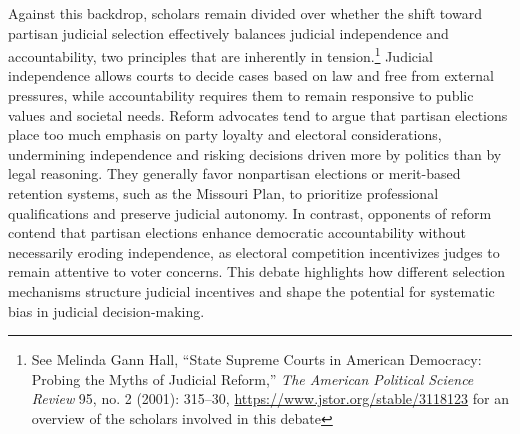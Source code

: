 Against this backdrop, scholars remain divided over whether the shift
toward partisan judicial selection effectively balances judicial
independence and accountability, two principles that are inherently in
tension.\footnote{See Melinda Gann Hall, {``State {Supreme Courts} in
  {American Democracy}: {Probing} the {Myths} of {Judicial Reform},''}
  \emph{The American Political Science Review} 95, no. 2 (2001):
  315--30, \url{https://www.jstor.org/stable/3118123} for an overview of
  the scholars involved in this debate} Judicial independence allows
courts to decide cases based on law and free from external pressures,
while accountability requires them to remain responsive to public values
and societal needs. Reform advocates tend to argue that partisan
elections place too much emphasis on party loyalty and electoral
considerations, undermining independence and risking decisions driven
more by politics than by legal reasoning. They generally favor
nonpartisan elections or merit-based retention systems, such as the
Missouri Plan, to prioritize professional qualifications and preserve
judicial autonomy. In contrast, opponents of reform contend that
partisan elections enhance democratic accountability without necessarily
eroding independence, as electoral competition incentivizes judges to
remain attentive to voter concerns. This debate highlights how different
selection mechanisms structure judicial incentives and shape the
potential for systematic bias in judicial decision-making.

